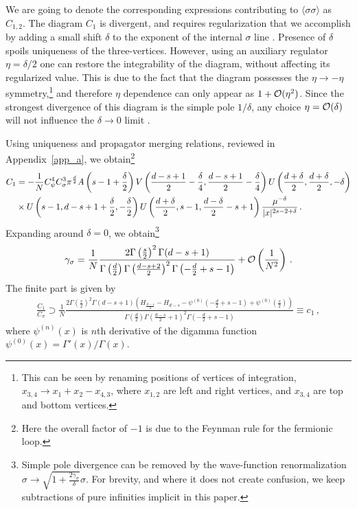 \documentclass[aps,amsmath,amssymb,prd,showpacs,floatfix,preprint,superscriptaddress,nofootinbib,12pt]{article}
\begin{document}
We are going to denote the corresponding expressions
contributing to $\langle\sigma\sigma\rangle$ as $C_{1,2}$.
The diagram $C_1$ 
is divergent, and requires regularization that we accomplish
by adding a small shift $\delta$ to the exponent of the
internal $\sigma$ line \cite{Vasiliev:1975mq}. Presence of $\delta$
spoils uniqueness of the three-vertices. However, using an auxiliary
regulator $\eta = \delta/2$ one can restore the integrability of the diagram,
without affecting its regularized value. This is due
to the fact that the diagram possesses the $\eta\rightarrow-\eta$ symmetry,\footnote{
This can be seen by renaming positions of vertices of integration,
$x_{3,4}\rightarrow x_1+x_2-x_{4,3}$, where $x_{1,2}$ are left and right vertices,
and $x_{3,4}$ are top and bottom vertices.}
and therefore $\eta$ dependence can only appear as $1+{\cal O}(\eta^2)$.
Since the strongest divergence of this diagram is the simple pole $1/\delta$,
any choice $\eta={\cal O}(\delta)$ will not influence the $\delta\rightarrow 0$ limit \cite{Vasiliev:1981yc,Vasiliev:1981dg,Belokurov:1983rkp,Ciuchini:1999wy,Gubser:2017vgc}.

Using uniqueness and propagator merging relations, reviewed in
Appendix~\ref{app_a}, we obtain\footnote{Here the overall factor of $-1$
is due to the Feynman rule for the fermionic loop.}
\begin{align}
C_1 &=-\frac{1}{N} C_\psi^4C_\sigma^3
\pi^\frac{d}{2}A\left(s-1+\frac{\delta}{2}\right)
V\left(\frac{d-s+1}{2}-\frac{\delta}{4},\frac{d-s+1}{2}-\frac{\delta}{4}\right)
U\left(\frac{d+\delta}{2},\frac{d+\delta}{2},-\delta\right)\notag\\
&\times U\left(s-1,d-s+1+\frac{\delta}{2},-\frac{\delta}{2}\right)
U\left(\frac{d+\delta}{2},s-1,\frac{d-\delta}{2}-s+1\right)\frac{\mu^{-\delta}}{|x|^{2s-2+\delta}}\,.
\end{align}
Expanding around $\delta = 0$, we obtain\footnote{Simple pole divergence
can be removed by the wave-function renormalization
$\sigma\rightarrow\sqrt{1+\frac{2\gamma_\sigma}{\delta}}\sigma$.
For brevity, and where it does not create confusion, we keep subtractions of
pure infinities implicit in this paper.}
\begin{equation}
\label{gamma sigma result}
\gamma_\sigma = \frac{1}{N}
\frac{2 \Gamma \left(\frac{s}{2}\right)^2 \Gamma (d-s+1)}
{\Gamma \left(\frac{d}{2}\right) \Gamma \left(\frac{d-s+2}{2} \right)^2 \Gamma \left(-\frac{d}{2}+s-1\right)}
+{\cal O}\left(\frac{1}{N^2}\right)\,.
\end{equation}
The finite part is given by
\begin{align}
\label{C1}
\frac{C_1}{C_\sigma}\supset \frac{1}{N}\frac{2 \Gamma \left(\frac{s}{2}\right)^2 \Gamma (d{-}s{+}1) \left(H_{\frac{d{-}s}{2}}{-}H_{d{-}s}{-}\psi ^{(0)}\left({-}\frac{d}{2}{+}s{-}1\right){+}\psi ^{(0)}\left(\frac{s}{2}\right)\right)}{ \Gamma \left(\frac{d}{2}\right) \Gamma \left(\frac{d{-}s}{2} {+}1\right)^2 \Gamma \left({-}\frac{d}{2}{+}s{-}1\right)}\equiv c_1\,,
\end{align}
where $\psi^{(n)}(x)$ is $n$th derivative of the digamma function $\psi^{(0)}(x)=\Gamma'(x)/\Gamma(x)$.
\end{document}
